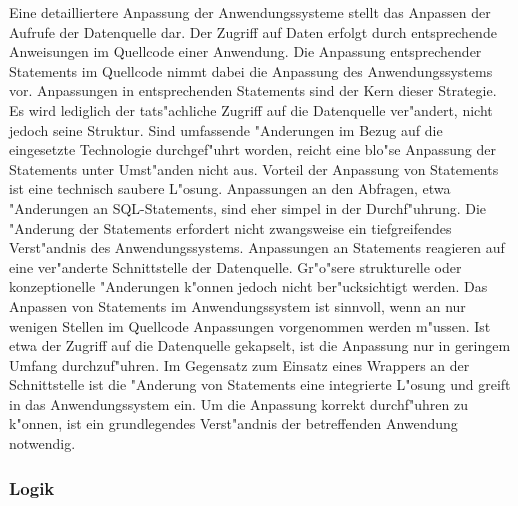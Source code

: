 Eine detailliertere Anpassung der Anwendungssysteme stellt das Anpassen der Aufrufe der Datenquelle dar. Der Zugriff auf Daten erfolgt durch entsprechende Anweisungen im Quellcode einer Anwendung. Die Anpassung entsprechender Statements im Quellcode nimmt dabei die Anpassung des Anwendungssystems vor. Anpassungen in entsprechenden Statements sind der Kern dieser Strategie. Es wird lediglich der tats"achliche Zugriff auf die Datenquelle ver"andert, nicht jedoch seine Struktur. Sind umfassende "Anderungen im Bezug auf die eingesetzte Technologie durchgef"uhrt worden, reicht eine blo"se Anpassung der Statements unter Umst"anden nicht aus.
\lb
%
%
Vorteil der Anpassung von Statements ist eine technisch saubere L"osung. Anpassungen an den Abfragen, etwa "Anderungen an SQL-Statements, sind eher simpel in der Durchf"uhrung. Die "Anderung der Statements erfordert nicht zwangsweise ein tiefgreifendes Verst"andnis des Anwendungssystems. 
\lb
Anpassungen an Statements reagieren auf eine ver"anderte Schnittstelle der Datenquelle. Gr"o"sere strukturelle oder konzeptionelle "Anderungen k"onnen jedoch nicht ber"ucksichtigt werden.
\lb
Das Anpassen von Statements im Anwendungssystem ist sinnvoll, wenn an nur wenigen Stellen im Quellcode Anpassungen vorgenommen werden m"ussen. Ist etwa der Zugriff auf die Datenquelle gekapselt, ist die Anpassung nur in geringem Umfang durchzuf"uhren. Im Gegensatz zum Einsatz eines Wrappers an der Schnittstelle ist die "Anderung von Statements eine integrierte L"osung und greift in das Anwendungssystem ein. Um die Anpassung korrekt durchf"uhren zu k"onnen, ist ein grundlegendes Verst"andnis der betreffenden Anwendung notwendig.

\subsubsection{Logik}

